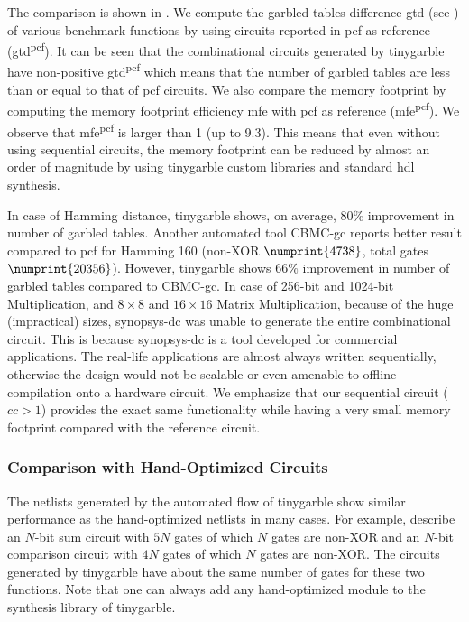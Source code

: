 The comparison is shown in .
We compute the garbled tables difference \acrshort{gtd} (see ) of various benchmark functions by using circuits reported in \gls{pcf} as reference (\acrshort{gtd}\textsuperscript{\gls{pcf}}).
It can be seen that the combinational circuits generated by \gls{tinygarble} have non-positive \acrshort{gtd}\textsuperscript{\gls{pcf}} which means that the number of garbled tables are less than or equal to that of \gls{pcf} circuits.
We also compare the memory footprint by computing the memory footprint efficiency \acrshort{mfe} with \gls{pcf} as reference (\acrshort{mfe}\textsuperscript{\gls{pcf}}).
We observe that \acrshort{mfe}\textsuperscript{\gls{pcf}} is larger than 1 (up to 9.3).
This means that even without using sequential circuits, the memory footprint can be reduced by almost an order of magnitude by using \gls{tinygarble} custom libraries and standard \acrshort{hdl} synthesis.

In case of Hamming distance, \gls{tinygarble} shows, on average, $80\%$ improvement in number of garbled tables.
Another automated tool CBMC-\acrshort{gc} \cite{franz2014cbmc} reports better result compared to \gls{pcf} for Hamming 160 (non-XOR $\numprint{4738}$, total gates $\numprint{20356}$).
However, \gls{tinygarble} shows $66\%$ improvement in number of garbled tables compared to CBMC-\acrshort{gc}.
In case of 256-bit and 1024-bit Multiplication, and $8\times 8$ and $16\times 16$ Matrix Multiplication, because of the huge (impractical) sizes, \gls{synopsys-dc} was unable to generate the entire combinational circuit.
This is because \gls{synopsys-dc} is a tool developed for commercial applications.
The real-life applications are almost always written sequentially, otherwise the design would not be scalable or even amenable to offline compilation onto a hardware circuit.
We emphasize that our sequential circuit ($cc>1$) provides the exact same functionality while having a very small memory footprint compared with the reference circuit.

\subsubsection{Comparison with Hand-Optimized Circuits} \label{sssec:eval-tinygarble-comb-hand}
The \gls{netlist}s generated by the automated flow of \gls{tinygarble} show similar performance as the hand-optimized \gls{netlist}s in many cases.
For example, \cite{kolesnikov2009improved} describe an $N$-bit sum circuit with $5N$ gates of which $N$ gates are non-XOR and an $N$-bit comparison circuit with $4N$ gates of which $N$ gates are non-XOR.
The circuits generated by \gls{tinygarble} have about the same number of gates for these two functions.
Note that one can always add any hand-optimized module to the synthesis library of \gls{tinygarble}.


